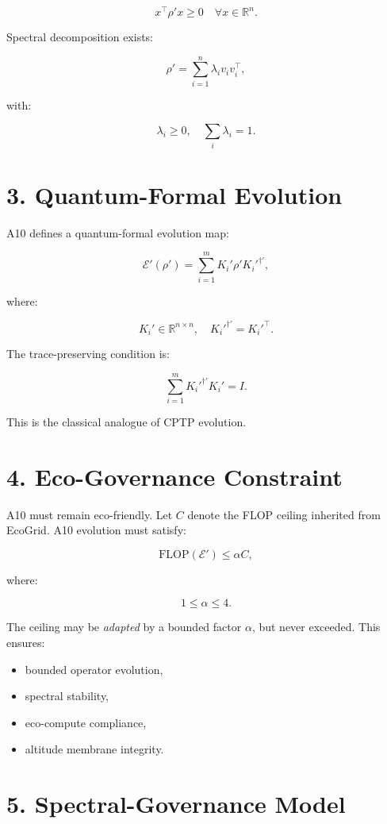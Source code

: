 \documentclass[11pt]{article}
\begin{document}
\[
x^\top \rho' x \ge 0 \quad \forall x \in \mathbb{R}^n.
\]

Spectral decomposition exists:

\[
\rho' = \sum_{i=1}^n \lambda_i v_i v_i^\top,
\]

with:

\[
\lambda_i \ge 0, \quad \sum_i \lambda_i = 1.
\]

\section*{3. Quantum-Formal Evolution}

A10 defines a quantum-formal evolution map:

\[
\mathcal{E}'(\rho') = \sum_{i=1}^m K_i' \rho' K_i'^{\dagger'},
\]

where:

\[
K_i' \in \mathbb{R}^{n \times n}, \quad K_i'^{\dagger'} = K_i'^\top.
\]

The trace-preserving condition is:

\[
\sum_{i=1}^m K_i'^{\dagger'} K_i' = I.
\]

This is the classical analogue of CPTP evolution.

\section*{4. Eco-Governance Constraint}

A10 must remain eco-friendly. Let \(C\) denote the FLOP ceiling inherited
from EcoGrid. A10 evolution must satisfy:

\[
\mathrm{FLOP}(\mathcal{E}') \le \alpha C,
\]

where:

\[
1 \le \alpha \le 4.
\]

The ceiling may be \emph{adapted} by a bounded factor \(\alpha\), but
never exceeded. This ensures:

\begin{itemize}
\item bounded operator evolution,
\item spectral stability,
\item eco-compute compliance,
\item altitude membrane integrity.
\end{itemize}

\section*{5. Spectral-Governance Model}
\end{document}
